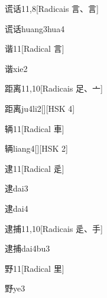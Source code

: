 \begin{entry}{谎话}{11,8}[Radicais ⾔、⾔]
  \begin{phonetics}{谎话}{huang3hua4}
  \end{phonetics}
\end{entry}

\begin{entry}{谐}{11}[Radical ⾔]
  \begin{phonetics}{谐}{xie2}
  \end{phonetics}
\end{entry}

\begin{entry}{距离}{11,10}[Radicais ⾜、⼇]
  \begin{phonetics}{距离}{ju4li2}[][HSK 4]
  \end{phonetics}
\end{entry}

\begin{entry}{辆}{11}[Radical ⾞]
  \begin{phonetics}{辆}{liang4}[][HSK 2]
  \end{phonetics}
\end{entry}

\begin{entry}{逮}{11}[Radical ⾡]
  \begin{phonetics}{逮}{dai3}
  \end{phonetics}
  \begin{phonetics}{逮}{dai4}
  \end{phonetics}
\end{entry}

\begin{entry}{逮捕}{11,10}[Radicais ⾡、⼿]
  \begin{phonetics}{逮捕}{dai4bu3}
  \end{phonetics}
\end{entry}

\begin{entry}{野}{11}[Radical ⾥]
  \begin{phonetics}{野}{ye3}
  \end{phonetics}
\end{entry}


